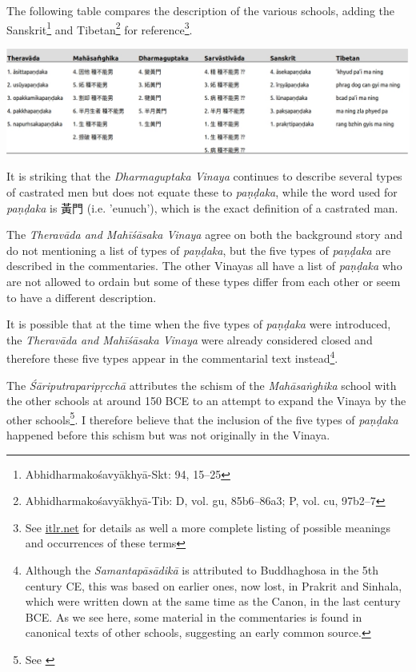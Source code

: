 The following table compares the description of the various schools, adding the Sanskrit\footnote{Abhidharmakośavyākhyā-Skt: 94, 15–25} and Tibetan\footnote{Abhidharmakośavyākhyā-Tib: D, vol. gu, 85b6–86a3; P, vol. cu, 97b2–7} for reference\footnote{See \href{http://www.itlr.net/hwid:281142}{itlr.net} for details as well a more complete listing of possible meanings and occurrences of these terms}.

\bigskip
\includegraphics[width=\linewidth]{pandaka.jpg}
\label{pandaka}
\medskip

It is striking that the {\em Dharmaguptaka Vinaya} continues to describe several types of castrated men but does not equate these to {\em paṇḍaka}, while the word used for {\em paṇḍaka} is 黃門 (i.e. 'eunuch'), which is the exact definition of a castrated man.

The {\em Theravāda and Mahīśāsaka Vinaya} agree on both the background story and do not mentioning a list of types of {\em paṇḍaka}, but the five types of {\em paṇḍaka} are described in the commentaries. The other Vinayas all have a list of {\em paṇḍaka} who are not allowed to ordain but some of these types differ from each other or seem to have a different description.

It is possible that at the time when the five types of {\em paṇḍaka} were introduced, the {\em Theravāda and Mahīśāsaka Vinaya} were already considered closed and therefore these five types appear in the commentarial text instead\footnote{Although the {\em Samantapāsādikā} is attributed to Buddhaghosa in the 5th century CE, this was based on earlier ones, now lost, in Prakrit and Sinhala, which were written down at the same time as the Canon, in the last century BCE. As we see here, some material in the commentaries is found in canonical texts of other schools, suggesting an early common source.}. 

The {\em Śāriputraparipṛcchā} attributes the schism of the {\em Mahāsaṅghika} school with the other schools at around 150 BCE to an attempt to expand the Vinaya by the other schools\footnote{See \cite{sujato2012}}. I therefore believe that the inclusion of the five types of {\em paṇḍaka} happened before this schism but was not originally in the Vinaya.

